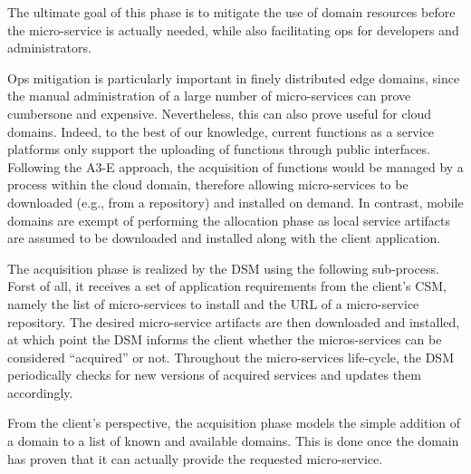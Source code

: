 

The ultimate goal of this phase is to mitigate the use of domain resources before the micro-service is actually needed, while also facilitating ops for developers and administrators. 

Ops mitigation is particularly important in finely distributed edge domains, since the manual administration of a large number of micro-services can prove cumbersone and expensive. Nevertheless, this can also prove useful for cloud domains. Indeed, to the best of our knowledge, current functions as a service platforms only support the uploading of functions through public interfaces. Following the A3-E approach, the acquisition of functions would be managed by a process within the cloud domain, therefore allowing micro-services to be downloaded (e.g., from a repository) and installed on demand. In contrast, mobile domains are exempt of performing the allocation phase as local service artifacts are assumed to be downloaded and installed along with the client application.


The acquisition phase is realized by the DSM using the following sub-process. Forst of all, it receives a set of application requirements from the client's CSM, namely the list of micro-services to install and the URL of a micro-service repository. The desired micro-service artifacts are then downloaded and installed, at which point the DSM informs the client whether the micros-services can be considered ``acquired'' or not. Throughout the micro-services life-cycle, the DSM periodically checks for new versions of acquired services and updates them accordingly. 



From the client's perspective, the acquisition phase models the simple addition of a domain to a list of known and available domains. This is done once the domain has proven that it can actually provide the requested micro-service. 


